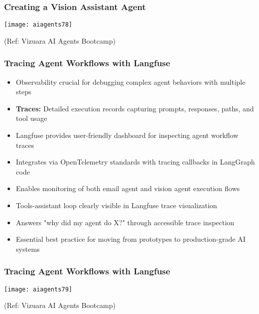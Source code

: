 \begin{frame}[fragile]\frametitle{Creating a Vision Assistant Agent}

        \begin{center}

        \texttt{[image: aiagents78]}
		
		{\tiny (Ref: Vizuara AI Agents Bootcamp)}
				
        \end{center}    

\end{frame}



\begin{frame}[fragile]\frametitle{Tracing Agent Workflows with Langfuse}

      \begin{itemize}
        \item Observability crucial for debugging complex agent behaviors with multiple steps
        \item \textbf{Traces:} Detailed execution records capturing prompts, responses, paths, and tool usage
        \item Langfuse provides user-friendly dashboard for inspecting agent workflow traces
        \item Integrates via OpenTelemetry standards with tracing callbacks in LangGraph code
        \item Enables monitoring of both email agent and vision agent execution flows
        \item Tools-assistant loop clearly visible in Langfuse trace visualization
        \item Answers "why did my agent do X?" through accessible trace inspection
        \item Essential best practice for moving from prototypes to production-grade AI systems
      \end{itemize}

\end{frame}

\begin{frame}[fragile]\frametitle{Tracing Agent Workflows with Langfuse}

        \begin{center}

        \texttt{[image: aiagents79]}
		
		{\tiny (Ref: Vizuara AI Agents Bootcamp)}
				
        \end{center}    

\end{frame}

